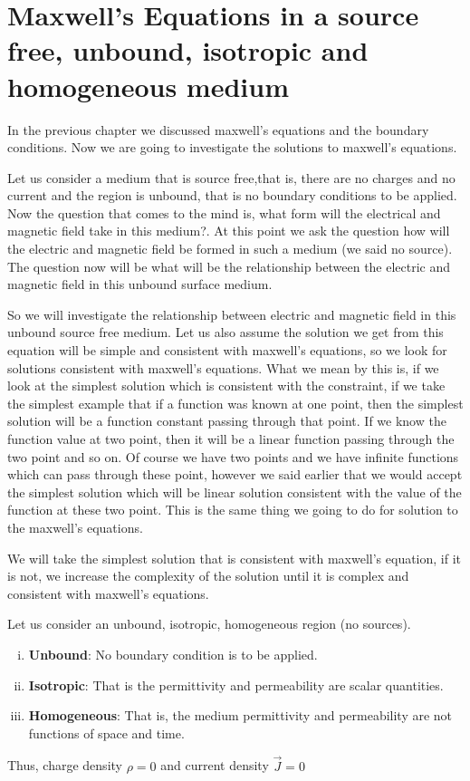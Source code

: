\chapter{Maxwell's Equations in a source free, unbound, isotropic and homogeneous medium}\label{lec:lec21}

In the previous chapter we discussed maxwell's equations and the boundary conditions. Now we are going to investigate the solutions to maxwell's equations.

Let us consider a medium that is source free,that is, there are no charges and no current and the region is unbound, that is no boundary conditions to be applied. Now the question that comes to the mind is, what form will the electrical and magnetic field take in this medium?. At this point we ask the question how will the electric and magnetic field be formed in such a medium (we said no source). The question now will be what will be the relationship between the electric and magnetic field in this unbound surface medium.

So we will investigate the relationship between electric and magnetic field in this unbound source free medium. Let us also assume the solution we get from this equation will be simple and consistent with maxwell's equations, so we look for solutions consistent with maxwell's  equations. What we mean by this is, if we look at the simplest solution which is consistent with the constraint, if we take the simplest example that if a function was known at one point, then the simplest solution will be a function constant passing through that point. If we know the function value at two point, then it will be a linear function passing through the two point and so on. Of course we have two points and we have infinite functions which can pass through these point, however we said earlier that we would accept the simplest solution which will be linear solution consistent with the value of the function at these two point. This is the same thing we going to do for solution to the maxwell's equations. 

We will take the simplest solution that is consistent with maxwell's equation, if it is not, we increase the complexity of the solution until it is complex and consistent with maxwell's equations.

Let us consider an unbound, isotropic, homogeneous region (no sources).
\begin{enumerate}[(i)]
\item \textbf{Unbound}: No boundary condition is to be applied.
\item \textbf{Isotropic}: That is the permittivity and permeability are scalar quantities.
\item \textbf{Homogeneous}: That is, the medium permittivity and permeability are not functions of space and time. 
\end{enumerate}
Thus, charge density $\rho=0$ and current density $\vec{J}=0$


